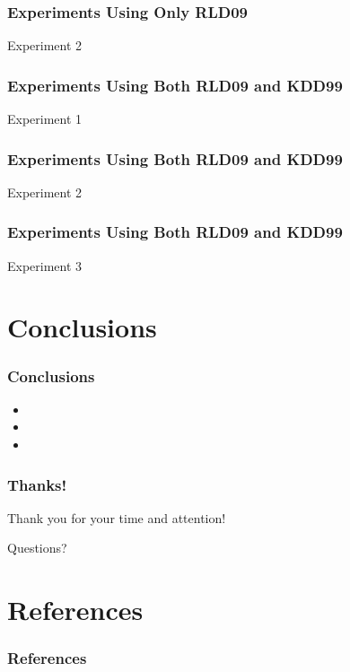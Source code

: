 \documentclass{beamer}
\newcommand{\linespace}{\vskip 0.25cm}
\begin{document}
\begin{frame}
	\frametitle{Experiments Using Only RLD09}
Experiment 2
	
\end{frame}


\begin{frame}
	\frametitle{Experiments Using Both RLD09 and KDD99}
Experiment 1
	
\end{frame}


\begin{frame}
	\frametitle{Experiments Using Both RLD09 and KDD99}
Experiment 2
	
\end{frame}


\begin{frame}
	\frametitle{Experiments Using Both RLD09 and KDD99}
Experiment 3
	
\end{frame}
\section[Conclusions]{Conclusions}

\begin{frame}
\frametitle{Conclusions}

\begin{itemize}
  \item 
  
  \linespace
  
  \item 

  \linespace
  
  \item
\end{itemize}


\end{frame}

\begin{frame}
	\frametitle{Thanks!}
	
	Thank you for your time and attention!
		
	\linespace
	\linespace
	
	\begin{center}
	{\huge Questions?}
	\end{center}
\end{frame}

\section*{References}

\begin{frame} 
	\frametitle{References} 
	
	\begin{thebibliography}{lskdjf}
	
  	\end{thebibliography}
	
\end{frame} 
\end{document}
